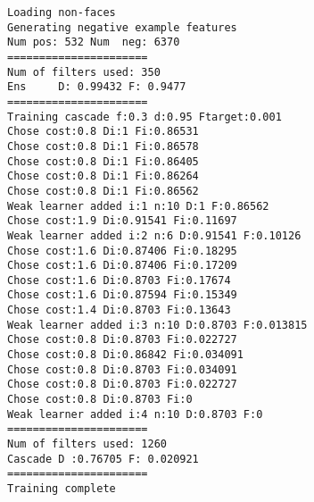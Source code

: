\documentclass[letterpaper,12pt]{article}
\begin{document}
\begin{verbatim}
Loading non-faces
Generating negative example features
Num pos: 532 Num  neg: 6370
======================
Num of filters used: 350
Ens     D: 0.99432 F: 0.9477
======================
Training cascade f:0.3 d:0.95 Ftarget:0.001
Chose cost:0.8 Di:1 Fi:0.86531
Chose cost:0.8 Di:1 Fi:0.86578
Chose cost:0.8 Di:1 Fi:0.86405
Chose cost:0.8 Di:1 Fi:0.86264
Chose cost:0.8 Di:1 Fi:0.86562
Weak learner added i:1 n:10 D:1 F:0.86562
Chose cost:1.9 Di:0.91541 Fi:0.11697
Weak learner added i:2 n:6 D:0.91541 F:0.10126
Chose cost:1.6 Di:0.87406 Fi:0.18295
Chose cost:1.6 Di:0.87406 Fi:0.17209
Chose cost:1.6 Di:0.8703 Fi:0.17674
Chose cost:1.6 Di:0.87594 Fi:0.15349
Chose cost:1.4 Di:0.8703 Fi:0.13643
Weak learner added i:3 n:10 D:0.8703 F:0.013815
Chose cost:0.8 Di:0.8703 Fi:0.022727
Chose cost:0.8 Di:0.86842 Fi:0.034091
Chose cost:0.8 Di:0.8703 Fi:0.034091
Chose cost:0.8 Di:0.8703 Fi:0.022727
Chose cost:0.8 Di:0.8703 Fi:0
Weak learner added i:4 n:10 D:0.8703 F:0
======================
Num of filters used: 1260
Cascade D :0.76705 F: 0.020921
======================
Training complete
\end{verbatim}
\end{document}
